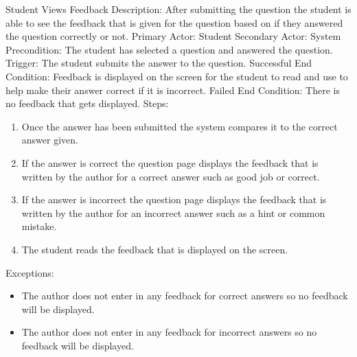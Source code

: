     
    \begin{section}{Student Views Feedback}
        Description: After submitting the question the student is able to see the feedback that is given for the 
        question based on if they answered the question correctly or not. \newline
        Primary Actor: Student \newline
        Secondary Actor: System \newline
        Precondition: The student has selected a question and answered the question. \newline
        Trigger: The student submits the answer to the question. \newline
        Successful End Condition: Feedback is displayed on the screen for the student 
        to read and use to help make their answer correct if it is incorrect. \newline
        Failed End Condition: There is no feedback that gets displayed. \newline
        \newline
        Steps:
        \begin{enumerate}
            \item{Once the answer has been submitted the system compares it to the correct answer given.}
            \item{If the answer is correct the question page displays the feedback that is 
            written by the author for a correct answer such as good job or correct.}
            \item{If the answer is incorrect the question page displays the feedback that is 
            written by the author for an incorrect answer such as a hint or common mistake.}
            \item{The student reads the feedback that is displayed on the screen.}
        \end{enumerate}
        Exceptions:
        \begin{itemize}
            \item{The author does not enter in any feedback for correct answers so no feedback will be displayed.}
            \item{The author does not enter in any feedback for incorrect answers so no feedback will be displayed.}
        \end{itemize}
                

    \end{section}
        
